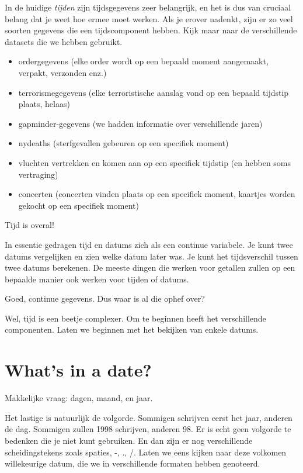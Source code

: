 \documentclass[]{tufte-book}
\providecommand{\tightlist}{%
  \setlength{\itemsep}{0pt}\setlength{\parskip}{0pt}}
\begin{document}
In de huidige \emph{tijden} zijn tijdsgegevens zeer belangrijk, en het is dus van cruciaal belang dat je weet hoe ermee moet werken. Als je erover nadenkt, zijn er zo veel soorten gegevens die een tijdscomponent hebben. Kijk maar naar de verschillende datasets die we hebben gebruikt.

\begin{itemize}
\tightlist
\item
  ordergegevens (elke order wordt op een bepaald moment aangemaakt, verpakt, verzonden enz.)
\item
  terrorismegegevens (elke terroristische aanslag vond op een bepaald tijdstip plaats, helaas)
\item
  gapminder-gegevens (we hadden informatie over verschillende jaren)
\item
  nydeaths (sterfgevallen gebeuren op een specifiek moment)
\item
  vluchten vertrekken en komen aan op een specifiek tijdstip (en hebben soms vertraging)
\item
  concerten (concerten vinden plaats op een specifiek moment, kaartjes worden gekocht op een specifiek moment)
\end{itemize}

Tijd is overal!

In essentie gedragen tijd en datums zich als een continue variabele. Je kunt twee datums vergelijken en zien welke datum later was. Je kunt het tijdsverschil tussen twee datums berekenen. De meeste dingen die werken voor getallen zullen op een bepaalde manier ook werken voor tijden of datums.

Goed, continue gegevens. Dus waar is al die ophef over?

Wel, tijd is een beetje complexer. Om te beginnen heeft het verschillende componenten. Laten we beginnen met het bekijken van enkele datums.

\hypertarget{whats-in-a-date}{%
\section{What's in a date?}\label{whats-in-a-date}}

Makkelijke vraag: dagen, maand, en jaar.

Het lastige is natuurlijk de volgorde. Sommigen schrijven eerst het jaar, anderen de dag. Sommigen zullen 1998 schrijven, anderen 98. Er is echt geen volgorde te bedenken die je niet kunt gebruiken. En dan zijn er nog verschillende scheidingstekens zoals spaties, -, ., /. Laten we eens kijken naar deze volkomen willekeurige datum, die we in verschillende formaten hebben genoteerd.
\end{document}
